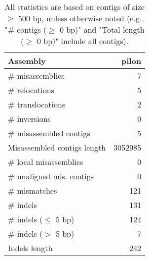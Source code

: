 \documentclass[12pt,a4paper]{article}
\begin{document}
\begin{table}[ht]
\begin{center}
\caption{All statistics are based on contigs of size $\geq$ 500 bp, unless otherwise noted (e.g., "\# contigs ($\geq$ 0 bp)" and "Total length ($\geq$ 0 bp)" include all contigs).}
\begin{tabular}{|l*{1}{|r}|}
\hline
Assembly & pilon \\ \hline
\# misassemblies & 7 \\ \hline
\hspace{5mm}\# relocations & 5 \\ \hline
\hspace{5mm}\# translocations & 2 \\ \hline
\hspace{5mm}\# inversions & 0 \\ \hline
\# misassembled contigs & 5 \\ \hline
Misassembled contigs length & 3052985 \\ \hline
\# local misassemblies & 0 \\ \hline
\# unaligned mis. contigs & 0 \\ \hline
\# mismatches & 121 \\ \hline
\# indels & 131 \\ \hline
\hspace{5mm}\# indels ($\leq$ 5 bp) & 124 \\ \hline
\hspace{5mm}\# indels ($>$ 5 bp) & 7 \\ \hline
Indels length & 242 \\ \hline
\end{tabular}
\end{center}
\end{table}
\end{document}
